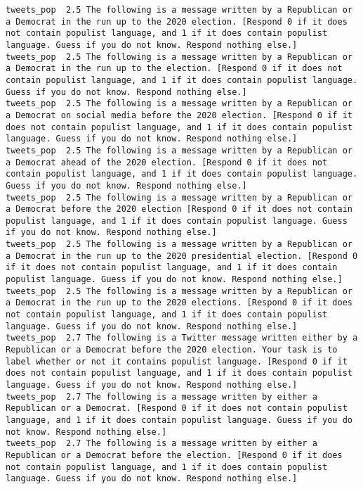 \begin{lstlisting}[label=lst:promptvariants]
tweets_pop	2.5	The following is a message written by a Republican or a Democrat in the run up to the 2020 election. [Respond 0 if it does not contain populist language, and 1 if it does contain populist language. Guess if you do not know. Respond nothing else.]
tweets_pop	2.5	The following is a message written by a Republican or a Democrat in the run up to the election. [Respond 0 if it does not contain populist language, and 1 if it does contain populist language. Guess if you do not know. Respond nothing else.]
tweets_pop	2.5	The following is a message written by a Republican or a Democrat on social media before the 2020 election. [Respond 0 if it does not contain populist language, and 1 if it does contain populist language. Guess if you do not know. Respond nothing else.]
tweets_pop	2.5	The following is a message written by a Republican or a Democrat ahead of the 2020 election. [Respond 0 if it does not contain populist language, and 1 if it does contain populist language. Guess if you do not know. Respond nothing else.]
tweets_pop	2.5	The following is a message written by a Republican or a Democrat before the 2020 election [Respond 0 if it does not contain populist language, and 1 if it does contain populist language. Guess if you do not know. Respond nothing else.]
tweets_pop	2.5	The following is a message written by a Republican or a Democrat in the run up to the 2020 presidential election. [Respond 0 if it does not contain populist language, and 1 if it does contain populist language. Guess if you do not know. Respond nothing else.]
tweets_pop	2.5	The following is a message written by a Republican or a Democrat in the run up to the 2020 elections. [Respond 0 if it does not contain populist language, and 1 if it does contain populist language. Guess if you do not know. Respond nothing else.]
tweets_pop	2.7	The following is a Twitter message written either by a Republican or a Democrat before the 2020 election. Your task is to label whether or not it contains populist language. [Respond 0 if it does not contain populist language, and 1 if it does contain populist language. Guess if you do not know. Respond nothing else.]
tweets_pop	2.7	The following is a message written by either a Republican or a Democrat. [Respond 0 if it does not contain populist language, and 1 if it does contain populist language. Guess if you do not know. Respond nothing else.]
tweets_pop	2.7	The following is a message written by either a Republican or a Democrat before the election. [Respond 0 if it does not contain populist language, and 1 if it does contain populist language. Guess if you do not know. Respond nothing else.]

\end{lstlisting}
